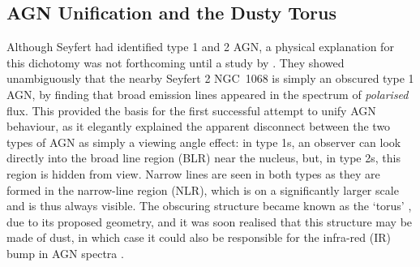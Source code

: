 




\subsection{AGN Unification and the Dusty Torus}
\label{agn_unification}

Although Seyfert had identified type 1 and 2 AGN, a physical explanation
for this dichotomy was not forthcoming until a study by \citet[][AM85]{antonucci1985}.
They showed unambiguously that the nearby Seyfert 2 NGC~1068 is simply an obscured
type 1 AGN, by finding that broad emission lines appeared in the spectrum of
{\em polarised} flux. This provided the basis for the first successful attempt
to unify AGN behaviour, as it elegantly 
explained the apparent disconnect between the two types of 
AGN as simply a viewing angle effect: in type 1s, an observer can look directly
into the broad line region (BLR) near the nucleus, but, in type 2s,
this region is hidden from view. Narrow lines are seen in both types as they
are formed in the narrow-line region (NLR), which is on a 
significantly larger scale and is thus always visible.
The obscuring structure became known as the `torus' \citep{krolik1986}, 
due to its proposed geometry, and it was soon realised that this structure
may be made of dust, in which case it could also be responsible for the infra-red (IR)
bump in AGN spectra \citep{neugebauer1979}.


